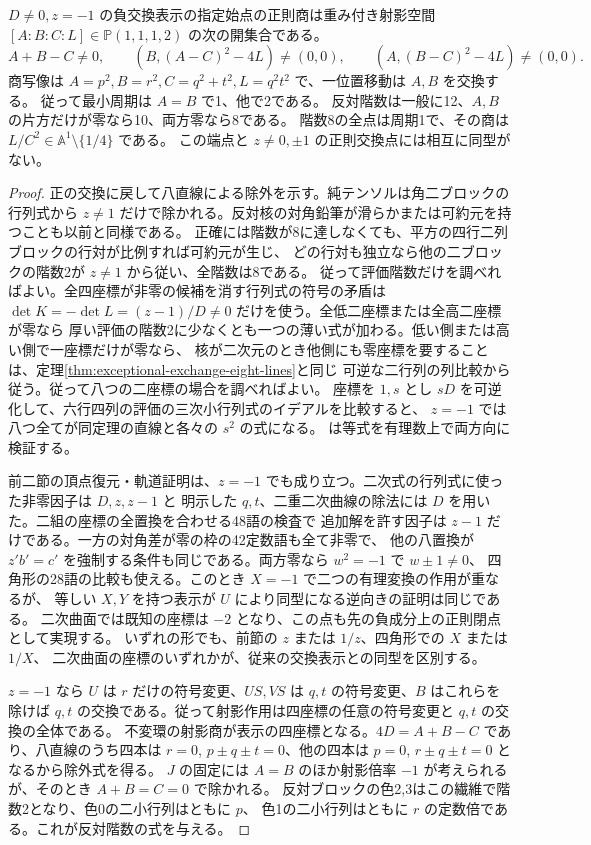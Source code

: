 \begin{theorem}\label{thm:negative-exchange-minus-one}
$D\ne0,z=-1$ の負交換表示の指定始点の正則商は重み付き射影空間
$[A:B:C:L]\in\mathbb P(1,1,1,2)$ の次の開集合である。
\[
 A+B-C\ne0,\qquad
 (B,(A-C)^2-4L)\ne(0,0),\qquad
 (A,(B-C)^2-4L)\ne(0,0).
\]
商写像は $A=p^2,B=r^2,C=q^2+t^2,L=q^2t^2$ で、一位置移動は $A,B$ を交換する。
従って最小周期は $A=B$ で1、他で2である。
反対階数は一般に12、$A,B$ の片方だけが零なら10、両方零なら8である。
階数8の全点は周期1で、その商は $L/C^2\in\mathbb A^1\setminus\{1/4\}$ である。
この端点と $z\ne0,\pm1$ の正則交換点には相互に同型がない。
\end{theorem}
\begin{proof}
正の交換に戻して八直線による除外を示す。純テンソルは角二ブロックの行列式から
$z\ne1$ だけで除かれる。反対核の対角鉛筆が滑らかまたは可約元を持つことも以前と同様である。
正確には階数が8に達しなくても、平方の四行二列ブロックの行対が比例すれば可約元が生じ、
どの行対も独立なら他の二ブロックの階数2が $z\ne1$ から従い、全階数は8である。
従って評価階数だけを調べればよい。全四座標が非零の候補を消す行列式の符号の矛盾は
$\det K=-\det L=(z-1)/D\ne0$ だけを使う。全低二座標または全高二座標が零なら
厚い評価の階数2に少なくとも一つの薄い式が加わる。低い側または高い側で一座標だけが零なら、
核が二次元のとき他側にも零座標を要することは、定理\ref{thm:exceptional-exchange-eight-lines}と同じ
可逆な二行列の列比較から従う。従って八つの二座標の場合を調べればよい。
座標を $1,s$ とし $sD$ を可逆化して、六行四列の評価の三次小行列式のイデアルを比較すると、
$z=-1$ では八つ全てが同定理の直線と各々の $s^2$ の式になる。
 は等式を有理数上で両方向に検証する。

前二節の頂点復元・軌道証明は、$z=-1$ でも成り立つ。二次式の行列式に使った非零因子は $D,z,z-1$ と
明示した $q,t$、二重二次曲線の除法には $D$ を用いた。二組の座標の全置換を合わせる48語の検査で
追加解を許す因子は $z-1$ だけである。一方の対角差が零の枠の42定数語も全て非零で、
他の八置換が $z'b'=c'$ を強制する条件も同じである。両方零なら $w^2=-1$ で $w\pm1\ne0$、
四角形の28語の比較も使える。このとき $X=-1$ で二つの有理変換の作用が重なるが、
等しい $X,Y$ を持つ表示が $U$ により同型になる逆向きの証明は同じである。
二次曲面では既知の座標は $-2$ となり、この点も先の負成分上の正則閉点として実現する。
いずれの形でも、前節の $z$ または $1/z$、四角形での $X$ または $1/X$、
二次曲面の座標のいずれかが、従来の交換表示との同型を区別する。

$z=-1$ なら $U$ は $r$ だけの符号変更、$US,VS$ は $q,t$ の符号変更、$B$ はこれらを除けば
$q,t$ の交換である。従って射影作用は四座標の任意の符号変更と $q,t$ の交換の全体である。
不変環の射影商が表示の四座標となる。$4D=A+B-C$ であり、八直線のうち四本は
$r=0$, $p\pm q\pm t=0$、他の四本は $p=0$, $r\pm q\pm t=0$ となるから除外式を得る。
$J$ の固定には $A=B$ のほか射影倍率 $-1$ が考えられるが、そのとき $A+B=C=0$ で除かれる。
反対ブロックの色2,3はこの繊維で階数2となり、色0の二小行列はともに $p$、
色1の二小行列はともに $r$ の定数倍である。これが反対階数の式を与える。
\end{proof}

